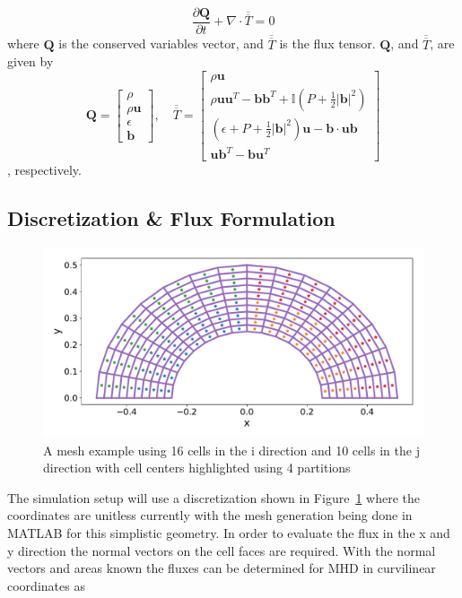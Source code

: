 \documentclass[paper=a4, fontsize=11pt]{scrartcl}
\newcommand*{\rttensor}[1]{\overline{\overline{#1}}}
\newcommand{\pfrac}[2]{\frac{\partial#1}{\partial#2}}
\numberwithin{equation}{section}                %
\numberwithin{figure}{section}                  %
\numberwithin{table}{section}                           %
\begin{document}
\begin{equation}\label{eqn:mhdvector}
  \pfrac{\mathbf{Q}}{t} + \nabla \cdot \rttensor{T} = 0
\end{equation}
where $\mathbf{Q}$ is the conserved variables vector, and $\rttensor{T}$ is the flux tensor. $\mathbf{Q}$, and $\rttensor{T}$, are given by
\[
  \mathbf{Q}=
  \begin{bmatrix}
    \rho  \\
    \rho \mathbf{u}  \\
    \epsilon\\
    \mathbf{b} 
  \end{bmatrix}
  ,\quad \rttensor{T} =
  \begin{bmatrix}
    \rho \mathbf{u}  \\
    \rho \mathbf{u}\mathbf{u}^T - \mathbf{b}\mathbf{b}^T + \mathbb{I}\left(P + \frac{1}{2}|\mathbf{b}|^2\right)\\
    \left(\epsilon + P + \frac{1}{2}|\mathbf{b}|^2\right)\mathbf{u}- \mathbf{b}\cdot\mathbf{u}\mathbf{b}\\
    \mathbf{u}\mathbf{b}^T-\mathbf{b}\mathbf{u}^T
  \end{bmatrix}
\]
, respectively. 



\subsection{Discretization \& Flux Formulation}\label{sec:disc}
  \begin{figure}[!htb]
    \centering
    \includegraphics[width=1.0\linewidth]{fig/16x10mesh.pdf}
    \caption{A mesh example using 16 cells in the i direction and 10 cells in the j direction with cell centers highlighted using 4 partitions}\label{fig:ovrvw:mesh}
  \end{figure}

The simulation setup will use a discretization shown in Figure~\ref{fig:ovrvw:mesh} where the coordinates are unitless currently with the mesh generation being done in MATLAB for this simplistic geometry. In order to evaluate the flux in the x and y direction the normal vectors on the cell faces are required. With the normal vectors and areas known the fluxes can be determined for MHD in curvilinear coordinates as
\end{document}
